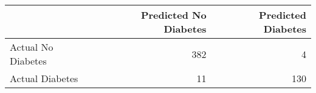 \begin{tabular}{lrr}
\toprule
 & Predicted No Diabetes & Predicted Diabetes \\
\midrule
Actual No Diabetes & 382 & 4 \\
Actual Diabetes & 11 & 130 \\
\bottomrule
\end{tabular}
